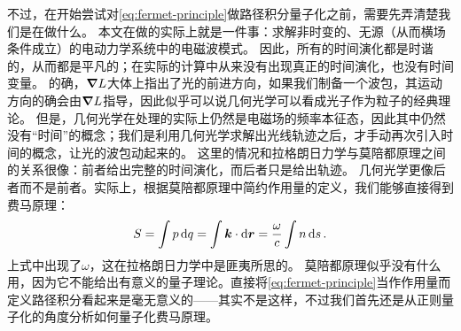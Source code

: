不过，在开始尝试对\eqref{eq:fermet-principle}做路径积分量子化之前，需要先弄清楚我们是在做什么。
本文在做的实际上就是一件事：求解非时变的、无源（从而横场条件成立）的电动力学系统中的电磁波模式。
因此，所有的时间演化都是时谐的，从而都是平凡的；在实际的计算中从来没有出现真正的时间演化，也没有时间变量。
的确，$\grad{L}$大体上指出了光的前进方向，如果我们制备一个波包，其运动方向的确会由$\grad{L}$指导，因此似乎可以说几何光学可以看成光子作为粒子的经典理论。
但是，几何光学在处理的实际上仍然是电磁场的频率本征态，因此其中仍然没有“时间”的概念；我们是利用几何光学求解出光线轨迹之后，才手动再次引入时间的概念，让光的波包动起来的。
这里的情况和拉格朗日力学与莫陪都原理之间的关系很像：前者给出完整的时间演化，而后者只是给出轨迹。
几何光学更像后者而不是前者。实际上，根据莫陪都原理中简约作用量的定义，我们能够直接得到费马原理：
\begin{equation}
    S = \int p \dd{q} = \int \vb*{k} \cdot \dd{\vb*{r}} = \frac{\omega}{c} \int n \dd{s}.
    \label{eq:abbr-action-ray}
\end{equation}
上式中出现了$\omega$，这在拉格朗日力学中是匪夷所思的。
莫陪都原理似乎没有什么用，因为它不能给出有意义的量子理论。直接将\eqref{eq:fermet-principle}当作作用量而定义路径积分看起来是毫无意义的——其实不是这样，不过我们首先还是从正则量子化的角度分析如何量子化费马原理。

